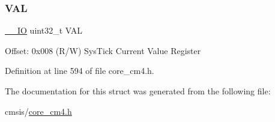 \subsubsection{\texorpdfstring{V\+AL}{VAL}}
{\footnotesize\ttfamily \hyperlink{group___c_m_s_i_s__core__definitions_gaec43007d9998a0a0e01faede4133d6be}{\+\_\+\+\_\+\+IO} uint32\+\_\+t V\+AL}

Offset\+: 0x008 (R/W) Sys\+Tick Current Value Register 

Definition at line 594 of file core\+\_\+cm4.\+h.



The documentation for this struct was generated from the following file\+:\begin{DoxyCompactItemize}
\item 
cmsis/\hyperlink{core__cm4_8h}{core\+\_\+cm4.\+h}\end{DoxyCompactItemize}
